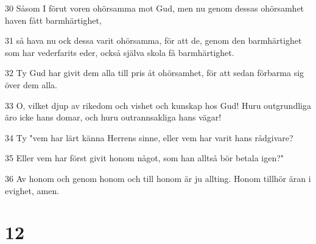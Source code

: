 \par 30 Såsom I förut voren ohörsamma mot Gud, men nu genom dessas ohörsamhet haven fått barmhärtighet,
\par 31 så hava nu ock dessa varit ohörsamma, för att de, genom den barmhärtighet som har vederfarits eder, också själva skola få barmhärtighet.
\par 32 Ty Gud har givit dem alla till pris åt ohörsamhet, för att sedan förbarma sig över dem alla.
\par 33 O, vilket djup av rikedom och vishet och kunskap hos Gud! Huru outgrundliga äro icke hans domar, och huru outrannsakliga hans vägar!
\par 34 Ty "vem har lärt känna Herrens sinne, eller vem har varit hans rådgivare?
\par 35 Eller vem har först givit honom något, som han alltså bör betala igen?"
\par 36 Av honom och genom honom och till honom är ju allting. Honom tillhör äran i evighet, amen.

\chapter{12}

